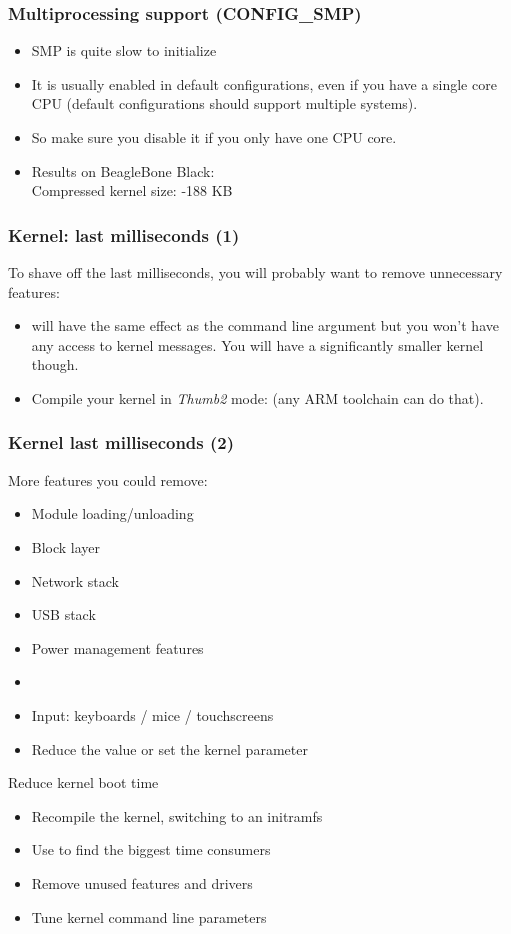 \begin{frame}
  \frametitle{Multiprocessing support (CONFIG\_SMP)}
  \begin{itemize}
          \item SMP is quite slow to initialize
          \item It is usually enabled in default configurations, even if
                you have a single core CPU (default configurations
                should support multiple systems).
          \item So make sure you disable it if you only have one CPU
                core.
          \item Results on BeagleBone Black:\\
                Compressed kernel size: -188 KB
  \end{itemize}
\end{frame}


\begin{frame}
\frametitle{Kernel: last milliseconds (1)}
To shave off the last milliseconds, you will probably want to remove
unnecessary features:
\begin{itemize}
        \item {} will have the same effect as the
               command line argument but you won't have
	      any access to kernel messages. You will have a
              significantly smaller kernel though.
	\item Compile your kernel in {\em Thumb2} mode:
	       (any ARM toolchain can do
	      that).
\end{itemize}
\end{frame}

\begin{frame}
\frametitle{Kernel last milliseconds (2)}
More features you could remove:
\begin{itemize}
        \item Module loading/unloading
        \item Block layer
        \item Network stack
        \item USB stack
        \item Power management features
        \item {}
        \item Input: keyboards / mice / touchscreens
        \item Reduce the  value or set the
               kernel parameter
\end{itemize}
\end{frame}

\setuplabframe
{Reduce kernel boot time}
{
\begin{itemize}
\item Recompile the kernel, switching to an initramfs
\item Use  to find the biggest
      time consumers
\item Remove unused features and drivers
\item Tune kernel command line parameters
\end{itemize}
}

